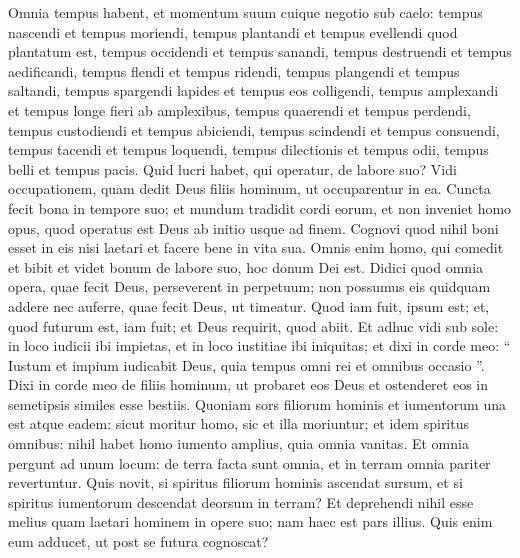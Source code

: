 \begin{biblechapter}
\begin{biblechapter}
\begin{biblechapter}
\verse Omnia tempus habent,
 et momentum suum cuique negotio sub caelo:
 \verse tempus nascendi et tempus moriendi,
 tempus plantandi et tempus evellendi quod plantatum est,
 \verse tempus occidendi et tempus sanandi,
 tempus destruendi et tempus aedificandi,
 \verse tempus flendi et tempus ridendi,
 tempus plangendi et tempus saltandi,
 \verse tempus spargendi lapides et tempus eos colligendi,
 tempus amplexandi et tempus longe fieri ab amplexibus,
 \verse tempus quaerendi et tempus perdendi,
 tempus custodiendi et tempus abiciendi,
 \verse tempus scindendi et tempus consuendi,
 tempus tacendi et tempus loquendi,
 \verse tempus dilectionis et tempus odii,
 tempus belli et tempus pacis.
 \verse Quid lucri habet, qui operatur, de labore suo?
 \verse Vidi occupationem, quam dedit Deus filiis hominum, ut occuparentur in ea. 
 \verse Cuncta fecit bona in tempore suo; et mundum tradidit cordi eorum, et non inveniet homo opus, quod operatus est Deus ab initio usque ad finem. 
\verse Cognovi quod nihil boni esset in eis nisi laetari et facere bene in vita sua. 
 \verse Omnis enim homo, qui comedit et bibit et videt bonum de labore suo, hoc donum Dei est. 
\verse Didici quod omnia opera, quae fecit Deus, perseverent in perpetuum; non possumus eis quidquam addere nec auferre, quae fecit Deus, ut timeatur. 
\verse Quod iam fuit, ipsum est; et, quod futurum est, iam fuit; et Deus requirit, quod abiit.
 \verse Et adhuc vidi sub sole: in loco iudicii ibi impietas, et in loco iustitiae ibi iniquitas; 
\verse et dixi in corde meo: “ Iustum et impium iudicabit Deus, quia tempus omni rei et omnibus occasio ”.
 \verse Dixi in corde meo de filiis hominum, ut probaret eos Deus et ostenderet eos in semetipsis similes esse bestiis. 
\verse Quoniam sors filiorum hominis et iumentorum una est atque eadem: sicut moritur homo, sic et illa moriuntur; et idem spiritus omnibus: nihil habet homo iumento amplius, quia omnia vanitas. 
 \verse Et omnia pergunt ad unum locum:
 de terra facta sunt omnia,
 et in terram omnia pariter revertuntur.
 \verse Quis novit, si spiritus filiorum hominis ascendat sursum, et si spiritus iumentorum descendat deorsum in terram? 
\verse Et deprehendi nihil esse melius quam laetari hominem in opere suo; nam haec est pars illius. Quis enim eum adducet, ut post se futura cognoscat?
 

\end{biblechapter}
\end{biblechapter}
\end{biblechapter}
